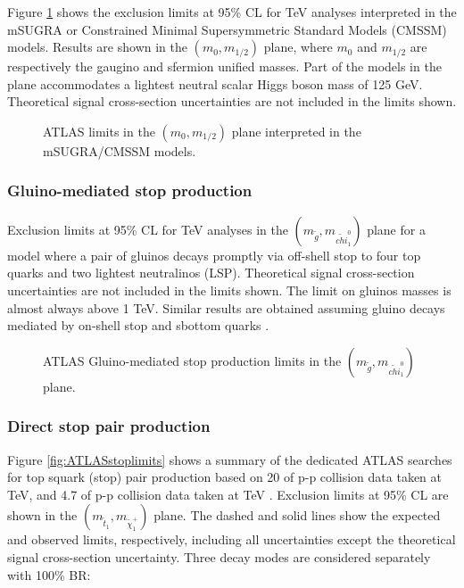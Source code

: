 Figure \ref{fig:ATLASmsugralimits} shows the exclusion limits at 95\% CL for \cmotto TeV analyses interpreted in the mSUGRA or Constrained Minimal Supersymmetric Standard Models (CMSSM) models. Results are shown in the $(m_0, m_{1/2})$ plane, where  $m_0$ and $m_{1/2}$ are respectively the gaugino and sfermion unified masses. Part of the models in the plane accommodates a lightest neutral scalar Higgs boson mass of 125 GeV. Theoretical signal cross-section uncertainties are not included in the limits shown. 
\begin{figure}[h]
\begin{center}
\end{center}
\caption[ATLAS mSUGRA/CMSSM limits]{ATLAS limits in the $(m_0, m_{1/2})$ plane interpreted in the mSUGRA/CMSSM models.}
\label{fig:ATLASmsugralimits}
\end{figure}

\subsubsection{Gluino-mediated stop production}

Exclusion limits at 95\% CL for \cmotto TeV analyses in the $(m_{\tilde{g}}, m_{\tilde{chi}_1^0})$ plane for a model where a pair of gluinos decays promptly via off-shell stop to four top quarks and two lightest neutralinos (LSP). Theoretical signal cross-section uncertainties are not included in the limits shown. The limit on gluinos masses is almost always above 1 TeV. Similar results are obtained assuming gluino decays mediated by on-shell stop and sbottom quarks \cite{atlas:strong1} \cite{atlas:strong2}.


\begin{figure}[h]
\begin{center}
\end{center}
\caption[ATLAS Gluino-mediated stop production limits]{ATLAS Gluino-mediated stop production limits in the $(m_{\tilde{g}}, m_{\tilde{chi}_1^0})$ plane.}
\label{fig:ATLASgluinolimits}
\end{figure}

\subsubsection{Direct stop pair production}

Figure \ref{fig:ATLASstoplimits} shows a summary of the dedicated ATLAS searches for top squark (stop) pair production based on 20 \ifb of p-p collision data taken at \cmotto TeV, and 4.7 \ifb of p-p collision data taken at \cmotto TeV \cite{atlas:stop0lep} \cite{atlas:stop2lep}. Exclusion limits at 95\% CL are shown in the $\left( m_{\tilde{t}_1}, m_{\tilde{\chi}^+_1} \right)$ plane. The dashed and solid lines show the expected and observed limits, respectively, including all uncertainties except the theoretical signal cross-section uncertainty. Three decay modes are considered separately with 100\% BR: 


